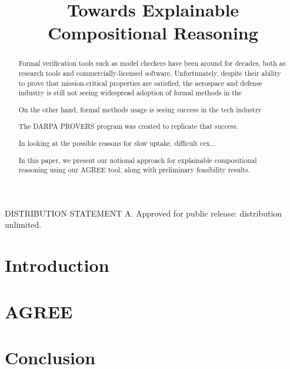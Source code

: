\documentclass[conference]{IEEEtran}
\begin{document}
\title{Towards Explainable Compositional Reasoning}



\maketitle

\begin{abstract}

Formal verification tools such as model checkers have been around for decades, both as research tools and commercially-licensed software.  Unfortunately, despite their ability to prove that mission-critical properties are satisfied, the aerospace and defense industry is still not seeing widespread adoption of formal methods in the 

On the other hand, formal methods usage is seeing success in the tech industry

The DARPA PROVERS program was created to replicate that success.

In looking at the possible reasons for slow uptake, difficult cex...

In this paper, we present our notional approach for explainable compositional reasoning using our AGREE tool, along with preliminary feasibility results.
	

\end{abstract}

DISTRIBUTION STATEMENT A. Approved for public release: distribution unlimited.

\section{Introduction}
\label{sec:introduction}


\section{AGREE}
\label{sec:agree}


\section{Conclusion}
\label{sec:conclusion}



%
%
\end{document}
